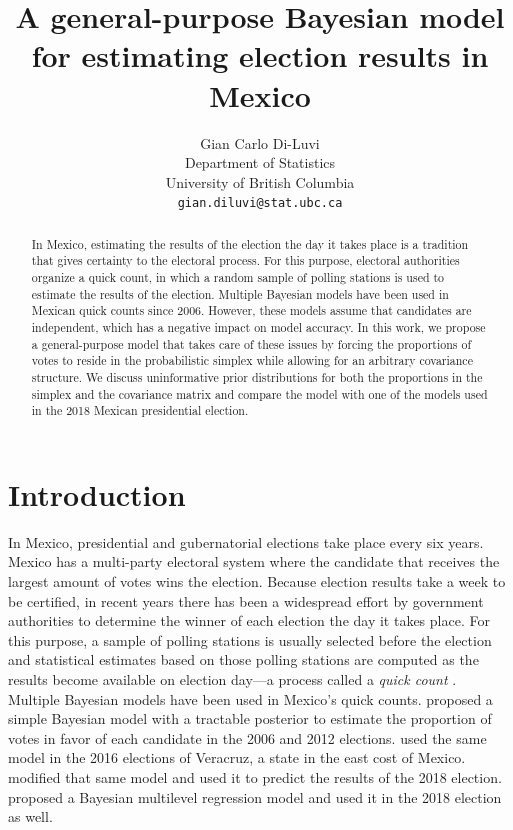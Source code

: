 \documentclass{article}
\title{A general-purpose Bayesian model for estimating election results in Mexico}
\author{%
  Gian Carlo Di-Luvi \\
  Department of Statistics\\
  University of British Columbia \\
  \texttt{gian.diluvi@stat.ubc.ca}
}
\begin{document}
\maketitle

\begin{abstract}
  In Mexico, estimating the results of the election the day it takes place is a tradition that gives certainty to the electoral process. For this purpose, electoral authorities organize a quick count, in which a random sample of polling stations is used to estimate the results of the election. Multiple Bayesian models have been used in Mexican quick counts since 2006. However, these models assume that candidates are independent, which has a negative impact on model accuracy. In this work, we propose a general-purpose model that takes care of these issues by forcing the proportions of votes to reside in the probabilistic simplex while allowing for an arbitrary covariance structure. We discuss uninformative prior distributions for both the proportions in the simplex and the covariance matrix and compare the model with one of the models used in the 2018 Mexican presidential election.
\end{abstract}



\section{Introduction} \label{sec:intro}


In Mexico, presidential and gubernatorial elections take place every six years. Mexico has a multi-party electoral system where the candidate that receives the largest amount of votes wins the election. Because election results take a week to be certified, in recent years there has been a widespread effort by government authorities to determine the winner of each election the day it takes place. For this purpose, a sample of polling stations is usually selected before the election and statistical estimates based on those polling stations are computed as the results become available on election day---a process called a \textit{quick count} \citep{carrera2019}.
\\



Multiple Bayesian models have been used in Mexico's quick counts. \citet{mendoza-nieto2016} proposed a simple Bayesian model with a tractable posterior to estimate the proportion of votes in favor of each candidate in the 2006 and 2012 elections. \citet{cerrillo2019} used the same model in the 2016 elections of Veracruz, a state in the east cost of Mexico. \citet{diluvi2018} modified that same model and used it to predict the results of the 2018 election. \citet{anzarut2018} proposed a Bayesian multilevel regression model and used it in the 2018 election as well.
\\
\end{document}
